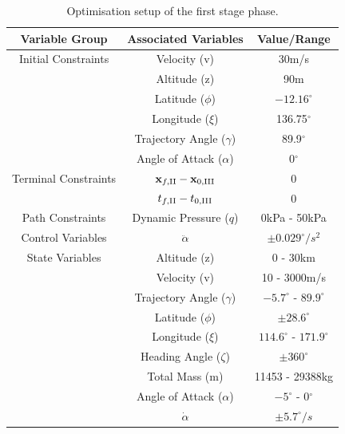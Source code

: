 \begin{table}[ht]
	\centering
	\begin{tabular}{|c|c|c|}
		\hline \textbf{Variable Group}  & \textbf{Associated Variables} & \textbf{Value/Range}\\
		\hline Initial Constraints  & Velocity (v) & 30m/s\\ & Altitude (z)& 90m \\ & Latitude ($\phi$)  & $-12.16^\circ$ \\& Longitude ($\xi$) & 136.75$^\circ$\\ & Trajectory Angle ($\gamma$) & 89.9$^\circ$\\ & Angle of Attack ($\alpha$)& 0$^\circ$\\
		\hline Terminal Constraints & $\textbf{x}_{f,\textrm{\rom{2}}} - \textbf{x}_{0,\textrm{\rom{3}}}$ & 0\\ & $t_{f,\textrm{\rom{2}}} - t_{0,\textrm{\rom{3}}}$ & 0\\
		\hline Path Constraints & Dynamic Pressure ($q$) & 0kPa - 50kPa\\ 
		\hline Control Variables & $\ddot{\alpha}$ & $\pm0.029^\circ/s^2$\\ 
		\hline State Variables & Altitude (z) & 0 - 30km\\ & Velocity (v) & 10 - 3000m/s\\ & Trajectory Angle ($\gamma$)& $-5.7^\circ$ - $89.9^\circ$ \\   & Latitude ($\phi$) & $\pm28.6^\circ$ \\  & Longitude ($\xi$)& $114.6^\circ$ - $171.9^\circ$\\   & Heading Angle ($\zeta$)& $\pm360^\circ$\\  & Total Mass (m)& 11453 - 29388kg \\  & Angle of Attack ($\alpha$)&  $-5^\circ$ - 0$^\circ$\\  & $\dot{\alpha}$& $\pm5.7^\circ/s$\\ 
		\hline 
	\end{tabular} 
	
	\caption{Optimisation setup of the first stage phase. }
	\label{tab:1ststagesetup}
\end{table}


